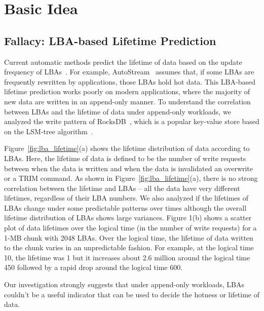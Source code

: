 \section{Basic Idea}
\subsection{Fallacy: LBA-based Lifetime Prediction}

Current automatic methods predict the lifetime of data based on the update
frequency of LBAs~\cite{AutoStream}.  
For example, AutoStream~\cite{AutoStream} assumes that, if
some LBAs are frequently rewritten by applications, those LBAs hold hot data.
This LBA-based lifetime prediction works poorly on modern applications, where
the majority of new data are written in an append-only manner.  To understand
the correlation between LBAs and the lifetime of data under append-only
workloads, we analyzed the write pattern of RocksDB~\cite{RocksDB}, which is a
popular key-value store based on the LSM-tree algorithm~\cite{LSM}.

Figure~\ref{fig:lba_lifetime}(a) shows the lifetime distribution of data
according to LBAs. Here, the lifetime of data is defined to be 
the number of write requests between when the data is written 
and when the data is invalidated an overwrite or a TRIM command. 
As shown in
Figure~\ref{fig:lba_lifetime}(a), there is no strong correlation between the
lifetime and LBAs -- all the data have very different lifetimes, regardless of
their LBA numbers. We also analyzed 
if the lifetimes of LBAs change under some predictable patterns over times 
although the overall lifetime distribution of LBAs shows large variances.
Figure 1(b) shows a scatter plot of data lifetimes over the logical time 
(in the number of write requests) for a 1-MB chunk with 2048 LBAs. 
Over the logical time, the lifetime of data written to the chunk 
varies in an unpredictable fashion.  
For example, at the logical time 10, the lifetime was 1 but it increases about 
2.6 million around the logical time 450 
followed by a rapid drop around the logical time 600. 

Our investigation strongly suggests that  under append-only
workloads, LBAs couldn't be a useful 
indicator that can be used to decide
the hotness or lifetime of data.

